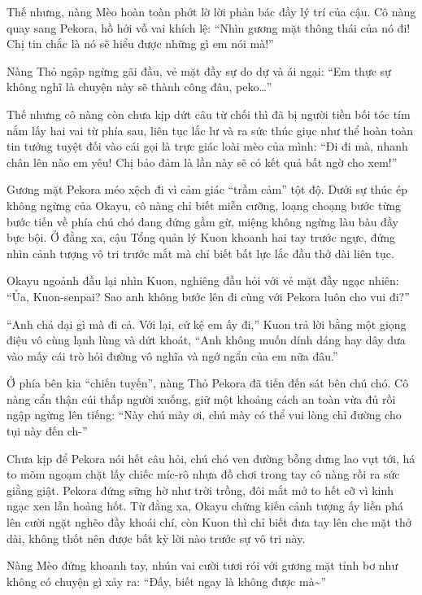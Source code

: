 \documentclass[../main.tex]{subfiles}
\begin{document}
Thế nhưng, nàng Mèo hoàn toàn phớt lờ lời phản bác đầy lý trí của cậu. Cô nàng quay sang Pekora, hồ hởi vỗ vai khích lệ: ``Nhìn gương mặt thông thái của nó đi! Chị tin chắc là nó sẽ hiểu được những gì em nói mà!''

Nàng Thỏ ngập ngừng gãi đầu, vẻ mặt đầy sự do dự và ái ngại: ``Em thực sự không nghĩ là chuyện này sẽ thành công đâu, peko\dots''

Thế nhưng cô nàng còn chưa kịp dứt câu từ chối thì đã bị người tiền bối tóc tím nắm lấy hai vai từ phía sau, liên tục lắc lư và ra sức thúc giục như thể hoàn toàn tin tưởng tuyệt đối vào cái gọi là trực giác loài mèo của mình: ``Đi đi mà, nhanh chân lên nào em yêu! Chị bảo đảm là lần này sẽ có kết quả bất ngờ cho xem!''


Gương mặt Pekora méo xệch đi vì cảm giác ``trầm cảm'' tột độ. Dưới sự thúc ép không ngừng của Okayu, cô nàng chỉ biết miễn cưỡng, loạng choạng bước từng bước tiến về phía chú chó đang đứng gầm gừ, miệng không ngừng làu bàu đầy bực bội. Ở đằng xa, cậu Tổng quản lý Kuon khoanh hai tay trước ngực, đứng nhìn cảnh tượng vô tri trước mắt mà chỉ biết bất lực lắc đầu thở dài liên tục.

Okayu ngoảnh đầu lại nhìn Kuon, nghiêng đầu hỏi với vẻ mặt đầy ngạc nhiên: ``Ủa, Kuon-senpai? Sao anh không bước lên đi cùng với Pekora luôn cho vui đi?''

``Anh chả dại gì mà đi cả. Với lại, cứ kệ em ấy đi,'' Kuon trả lời bằng một giọng điệu vô cùng lạnh lùng và dứt khoát, ``Anh không muốn dính dáng hay dây dưa vào mấy cái trò hỏi đường vô nghĩa và ngớ ngẩn của em nữa đâu.''

Ở phía bên kia ``chiến tuyến'', nàng Thỏ Pekora đã tiến đến sát bên chú chó. Cô nàng cẩn thận cúi thấp người xuống, giữ một khoảng cách an toàn vừa đủ rồi ngập ngừng lên tiếng: ``Này chú mày ơi, chú mày có thể vui lòng chỉ đường cho tụi này đến ch-''

Chưa kịp để Pekora nói hết câu hỏi, chú chó ven đường bỗng dưng lao vụt tới, há to mõm ngoạm chặt lấy chiếc míc-rô nhựa đồ chơi trong tay cô nàng rồi ra sức giằng giật. Pekora đứng sững hờ như trời trồng, đôi mắt mở to hết cỡ vì kinh ngạc xen lẫn hoảng hốt. Từ đằng xa, Okayu chứng kiến cảnh tượng ấy liền phá lên cười ngặt nghẽo đầy khoái chí, còn Kuon thì chỉ biết đưa tay lên che mặt thở dài, không thốt nên được bất kỳ lời nào trước sự vô tri này.


Nàng Mèo đứng khoanh tay, nhún vai cười tươi rói với gương mặt tỉnh bơ như không có chuyện gì xảy ra: ``Đấy, biết ngay là không được mà\~{}''
\end{document}
